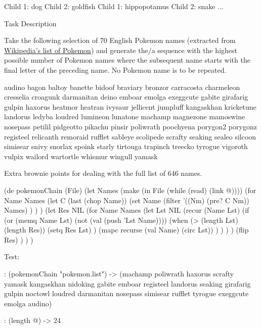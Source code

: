 \begin{wideverbatim}
Child 1: dog 
Child 2: goldfish
Child 1: hippopotamus
Child 2: snake
...
\end{wideverbatim}

Task Description

Take the following selection of 70 English Pokemon names (extracted from
\href{http://en.wikipedia.org/wiki/List\_of\_Pok\%C3\%A9mon}{Wikipedia's
list of Pokemon}) and generate the/a sequence with the highest possible
number of Pokemon names where the subsequent name starts with the final
letter of the preceding name. No Pokemon name is to be repeated.

\begin{wideverbatim}
audino bagon baltoy banette bidoof braviary bronzor carracosta charmeleon
cresselia croagunk darmanitan deino emboar emolga exeggcute gabite
girafarig gulpin haxorus heatmor heatran ivysaur jellicent jumpluff kangaskhan
kricketune landorus ledyba loudred lumineon lunatone machamp magnezone mamoswine
nosepass petilil pidgeotto pikachu pinsir poliwrath poochyena porygon2
porygonz registeel relicanth remoraid rufflet sableye scolipede scrafty seaking
sealeo silcoon simisear snivy snorlax spoink starly tirtouga trapinch treecko
tyrogue vigoroth vulpix wailord wartortle whismur wingull yamask
\end{wideverbatim}

Extra brownie points for dealing with the full list of 646 names.


\begin{wideverbatim}

(de pokemonChain (File)
   (let Names (make (in File (while (read) (link @))))
      (for Name Names
         (let C (last (chop Name))
            (set Name
               (filter '((Nm) (pre? C Nm)) Names) ) ) )
      (let Res NIL
         (for Name Names
            (let Lst NIL
               (recur (Name Lst)
                  (if (or (memq Name Lst) (not (val (push 'Lst Name))))
                     (when (> (length Lst) (length Res))
                        (setq Res Lst) )
                     (mapc recurse (val Name) (circ Lst)) ) ) ) )
         (flip Res) ) ) )

Test:

: (pokemonChain "pokemon.list")
-> (machamp poliwrath haxorus scrafty yamask kangaskhan nidoking gabite emboar
registeel landorus seaking girafarig gulpin noctowl loudred darmanitan nosepass
simisear rufflet tyrogue exeggcute emolga audino)

: (length @)
-> 24

\end{wideverbatim}

